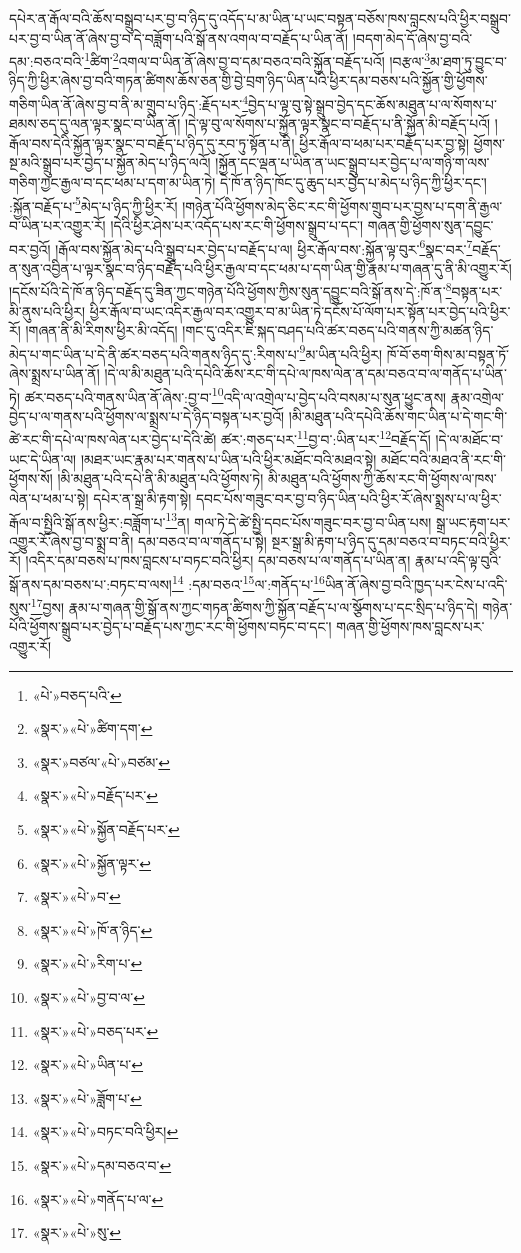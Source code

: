 དཔེར་ན་རྒོལ་བའི་ཆོས་བསྒྲུབ་པར་བྱ་བ་ཉིད་དུ་འདོད་པ་མ་ཡིན་པ་ཡང་བསྟན་བཅོས་ཁས་བླངས་པའི་ཕྱིར་བསྒྲུབ་པར་བྱ་བ་ཡིན་ནོ་ཞེས་བྱ་བ་དེ་བཟློག་པའི་སྒོ་ནས་འགལ་བ་བརྗོད་པ་ཡིན་ནོ། །བདག་མེད་དོ་ཞེས་བྱ་བའི་དམ་:བཅའ་བའི་\footnote{«པེ་»བཅད་པའི་}ཚིག་\footnote{«སྣར་»«པེ་»ཚིག་དག་}འགལ་བ་ཡིན་ནོ་ཞེས་བྱ་བ་དམ་བཅའ་བའི་སྐྱོན་བརྗོད་པའོ། །བརྩལ་\footnote{«སྣར་»བཙལ་«པེ་»བཙམ་}མ་ཐག་ཏུ་བྱུང་བ་ཉིད་ཀྱི་ཕྱིར་ཞེས་བྱ་བའི་གཏན་ཚིགས་ཆོས་ཅན་གྱི་བྱེ་བྲག་ཉིད་ཡིན་པའི་ཕྱིར་དམ་བཅས་པའི་སྐྱོན་གྱི་ཕྱོགས་གཅིག་ཡིན་ནོ་ཞེས་བྱ་བ་ནི་མ་གྲུབ་པ་ཉིད་:རྗོད་པར་\footnote{«སྣར་»«པེ་»བརྗོད་པར་}བྱེད་པ་ལྟ་བུ་སྟེ་སྒྲུབ་བྱེད་དང་ཆོས་མཐུན་པ་ལ་སོགས་པ་ཐམས་ཅད་དུ་ལན་ལྟར་སྣང་བ་ཡིན་ནོ། །དེ་ལྟ་བུ་ལ་སོགས་པ་སྐྱོན་ལྟར་སྣང་བ་བརྗོད་པ་ནི་སྐྱོན་མི་བརྗོད་པའོ། །རྒོལ་བས་དེའི་སྐྱོན་ལྟར་སྣང་བ་བརྗོད་པ་ཉིད་དུ་རབ་ཏུ་སྟོན་པ་ནི། ཕྱིར་རྒོལ་བ་ཕམ་པར་བརྗོད་པར་བྱ་སྟེ། ཕྱོགས་སྔ་མའི་སྒྲུབ་པར་བྱེད་པ་སྐྱོན་མེད་པ་ཉིད་ལའོ། །སྐྱོན་དང་ལྡན་པ་ཡིན་ན་ཡང་སྒྲུབ་པར་བྱེད་པ་ལ་གཉི་ག་ལས་གཅིག་ཀྱང་རྒྱལ་བ་དང་ཕམ་པ་དག་མ་ཡིན་ཏེ། དེ་ཁོ་ན་ཉིད་ཁོང་དུ་ཆུད་པར་བྱེད་པ་མེད་པ་ཉིད་ཀྱི་ཕྱིར་དང་། :སྐྱོན་བརྗོད་པ་\footnote{«སྣར་»«པེ་»སྐྱོན་བརྗོད་པར་}མེད་པ་ཉིད་ཀྱི་ཕྱིར་རོ། །གཉེན་པོའི་ཕྱོགས་མེད་ཅིང་རང་གི་ཕྱོགས་གྲུབ་པར་བྱས་པ་དག་ནི་རྒྱལ་བ་ཡིན་པར་འགྱུར་རོ། །དེའི་ཕྱིར་ཤེས་པར་འདོད་པས་རང་གི་ཕྱོགས་སྒྲུབ་པ་དང་། གཞན་གྱི་ཕྱོགས་སུན་དབྱུང་བར་བྱའོ། །རྒོལ་བས་སྐྱོན་མེད་པའི་སྒྲུབ་པར་བྱེད་པ་བརྗོད་པ་ལ། ཕྱིར་རྒོལ་བས་:སྐྱོན་ལྟ་བུར་\footnote{«སྣར་»«པེ་»སྐྱོན་ལྟར་}སྣང་བར་\footnote{«སྣར་»«པེ་»བ་}བརྗོད་ན་སུན་འབྱིན་པ་ལྟར་སྣང་བ་ཉིད་བརྗོད་པའི་ཕྱིར་རྒྱལ་བ་དང་ཕམ་པ་དག་ཡིན་གྱི་རྣམ་པ་གཞན་དུ་ནི་མི་འགྱུར་རོ། །དངོས་པོའི་དེ་ཁོ་ན་ཉིད་བརྗོད་དུ་ཟིན་ཀྱང་གཉེན་པོའི་ཕྱོགས་ཀྱིས་སུན་དབྱུང་བའི་སྒོ་ནས་དེ་:ཁོ་ན་\footnote{«སྣར་»«པེ་»ཁོ་ན་ཉིད་}བསྟན་པར་མི་ནུས་པའི་ཕྱིར། ཕྱིར་རྒོལ་བ་ཡང་འདིར་རྒྱལ་བར་འགྱུར་བ་མ་ཡིན་ཏེ་དངོས་པོ་ལོག་པར་སྟོན་པར་བྱེད་པའི་ཕྱིར་རོ། །གཞན་ནི་མི་རིགས་ཕྱིར་མི་འདོད། །གང་དུ་འདིར་ཇི་སྐད་བཤད་པའི་ཚར་བཅད་པའི་གནས་ཀྱི་མཚན་ཉིད་མེད་པ་གང་ཡིན་པ་དེ་ནི་ཚར་བཅད་པའི་གནས་ཉིད་དུ་:རིགས་པ་\footnote{«སྣར་»«པེ་»རིག་པ་}མ་ཡིན་པའི་ཕྱིར། ཁོ་བོ་ཅག་གིས་མ་བསྟན་ཏོ་ཞེས་སྨྲས་པ་ཡིན་ནོ། །དེ་ལ་མི་མཐུན་པའི་དཔེའི་ཆོས་རང་གི་དཔེ་ལ་ཁས་ལེན་ན་དམ་བཅའ་བ་ལ་གནོད་པ་ཡིན་ཏེ། ཚར་བཅད་པའི་གནས་ཡིན་ནོ་ཞེས་:བྱ་བ་\footnote{«སྣར་»«པེ་»བྱ་བ་ལ་}འདི་ལ་འགྲེལ་པ་བྱེད་པའི་བསམ་པ་སུན་ཕྱུང་ནས། རྣམ་འགྲེལ་བྱེད་པ་ལ་གནས་པའི་ཕྱོགས་ལ་སྨྲས་པ་དེ་ཉིད་བསྟན་པར་བྱའོ། །མི་མཐུན་པའི་དཔེའི་ཆོས་གང་ཡིན་པ་དེ་གང་གི་ཚེ་རང་གི་དཔེ་ལ་ཁས་ལེན་པར་བྱེད་པ་དེའི་ཚེ། ཚར་:གཅད་པར་\footnote{«སྣར་»«པེ་»བཅད་པར་}བྱ་བ་:ཡིན་པར་\footnote{«སྣར་»«པེ་»ཡིན་པ་}བརྗོད་དོ། །དེ་ལ་མཐོང་བ་ཡང་དེ་ཡིན་ལ། །མཐར་ཡང་རྣམ་པར་གནས་པ་ཡིན་པའི་ཕྱིར་མཐོང་བའི་མཐའ་སྟེ། མཐོང་བའི་མཐའ་ནི་རང་གི་ཕྱོགས་སོ། །མི་མཐུན་པའི་དཔེ་ནི་མི་མཐུན་པའི་ཕྱོགས་ཏེ། མི་མཐུན་པའི་ཕྱོགས་ཀྱི་ཆོས་རང་གི་ཕྱོགས་ལ་ཁས་ལེན་པ་ཕམ་པ་སྟེ། དཔེར་ན་སྒྲ་མི་རྟག་སྟེ། དབང་པོས་གཟུང་བར་བྱ་བ་ཉིད་ཡིན་པའི་ཕྱིར་རོ་ཞེས་སྨྲས་པ་ལ་ཕྱིར་རྒོལ་བ་སྤྱིའི་སྒོ་ནས་ཕྱིར་:བཟློག་པ་\footnote{«སྣར་»«པེ་»ཟློག་པ་}ན། གལ་ཏེ་དེ་ཚེ་སྤྱི་དབང་པོས་གཟུང་བར་བྱ་བ་ཡིན་པས། སྒྲ་ཡང་རྟག་པར་འགྱུར་རོ་ཞེས་བྱ་བ་སྨྲ་བ་ནི། དམ་བཅའ་བ་ལ་གནོད་པ་སྟེ། སྔར་སྒྲ་མི་རྟག་པ་ཉིད་དུ་དམ་བཅའ་བ་བཏང་བའི་ཕྱིར་རོ། །འདིར་དམ་བཅས་པ་ཁས་བླངས་པ་བཏང་བའི་ཕྱིར། དམ་བཅས་པ་ལ་གནོད་པ་ཡིན་ན། རྣམ་པ་འདི་ལྟ་བུའི་སྒོ་ནས་དམ་བཅས་པ་:བཏང་བ་ལས།\footnote{«སྣར་»«པེ་»བཏང་བའི་ཕྱིར།} :དམ་བཅའ་\footnote{«སྣར་»«པེ་»དམ་བཅའ་བ་}ལ་:གནོད་པ་\footnote{«སྣར་»«པེ་»གནོད་པ་ལ་}ཡིན་ནོ་ཞེས་བྱ་བའི་ཁྱད་པར་ངེས་པ་འདི་སུས་\footnote{«སྣར་»«པེ་»སུ་}བྱས། རྣམ་པ་གཞན་གྱི་སྒོ་ནས་ཀྱང་གཏན་ཚིགས་ཀྱི་སྐྱོན་བརྗོད་པ་ལ་སྩོགས་པ་དང་སྲིད་པ་ཉིད་དེ། གཉེན་པོའི་ཕྱོགས་སྒྲུབ་པར་བྱེད་པ་བརྗོད་པས་ཀྱང་རང་གི་ཕྱོགས་བཏང་བ་དང་། གཞན་གྱི་ཕྱོགས་ཁས་བླངས་པར་འགྱུར་རོ། 